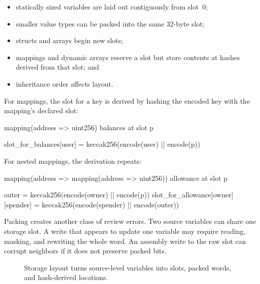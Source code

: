 \begin{itemize}
\item statically sized variables are laid out contiguously from slot~0;
\item smaller value types can be packed into the same 32-byte slot;
\item structs and arrays begin new slots;
\item mappings and dynamic arrays reserve a slot but store contents at hashes derived from that slot; and
\item inheritance order affects layout.
\end{itemize}

For mappings, the slot for a key is derived by hashing the encoded key with the mapping's declared slot:

\begin{codeblock}
mapping(address => uint256) balances at slot p

slot_for_balances[user] =
    keccak256(encode(user) || encode(p))
\end{codeblock}

For nested mappings, the derivation repeats:

\begin{codeblock}
mapping(address => mapping(address => uint256)) allowance at slot p

outer = keccak256(encode(owner) || encode(p))
slot_for_allowance[owner][spender] =
    keccak256(encode(spender) || encode(outer))
\end{codeblock}

Packing creates another class of review errors. Two source variables can share one storage slot. A write that appears to update one variable may require reading, masking, and rewriting the whole word. An assembly write to the raw slot can corrupt neighbors if it does not preserve packed bits.

\begin{figure}[htbp]
\centering
{}
\caption{Storage layout turns source-level variables into slots, packed words, and hash-derived locations.}
\end{figure}


